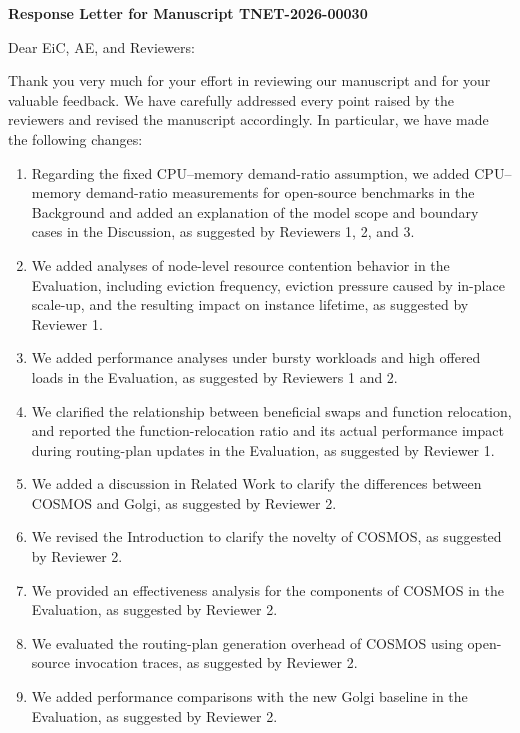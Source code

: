 \documentclass[11pt]{article}
\newcommand{\sysname}{COSMOS\xspace}
\begin{document}
\begin{center}
  {\Large\bfseries Response Letter for Manuscript TNET-2026-00030}\par
\end{center}

\vspace{12pt}
Dear EiC, AE, and Reviewers:

Thank you very much for your effort in reviewing our manuscript and for your valuable feedback. We have carefully addressed every point raised by the reviewers and revised the manuscript accordingly. In particular, we have made the following changes:

\begin{enumerate}[label=\arabic*.]
  \item Regarding the fixed CPU--memory demand-ratio assumption, we added CPU--memory demand-ratio measurements for open-source benchmarks in the Background and added an explanation of the model scope and boundary cases in the Discussion, as suggested by Reviewers 1, 2, and 3.
  \item We added analyses of node-level resource contention behavior in the Evaluation, including eviction frequency, eviction pressure caused by in-place scale-up, and the resulting impact on instance lifetime, as suggested by Reviewer 1.
  \item We added performance analyses under bursty workloads and high offered loads in the Evaluation, as suggested by Reviewers 1 and 2.
  \item We clarified the relationship between beneficial swaps and function relocation, and reported the function-relocation ratio and its actual performance impact during routing-plan updates in the Evaluation, as suggested by Reviewer 1.
  \item We added a discussion in Related Work to clarify the differences between \sysname and Golgi, as suggested by Reviewer 2.
  \item We revised the Introduction to clarify the novelty of \sysname, as suggested by Reviewer 2.
  \item We provided an effectiveness analysis for the components of \sysname in the Evaluation, as suggested by Reviewer 2.
  \item We evaluated the routing-plan generation overhead of \sysname using open-source invocation traces, as suggested by Reviewer 2.
  \item We added performance comparisons with the new Golgi baseline in the Evaluation, as suggested by Reviewer 2.

\end{enumerate}
\end{document}
